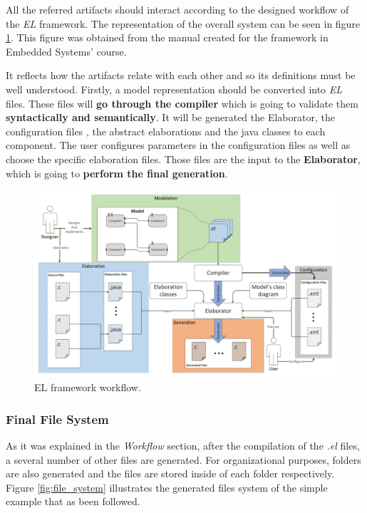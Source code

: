 All the referred artifacts should interact according to the designed workflow of the \textit{EL} framework. The representation of the overall system can be seen in figure \ref{fig:workflow}. This figure was obtained from the manual created for the framework in Embedded Systems' course. 

It reflects how the artifacts relate with each other and so its definitions must be well understood. Firstly, a model representation should be converted into \textit{EL} files. These files will \textbf{go through the compiler} which is going to validate them \textbf{syntactically and semantically}. It will be generated the Elaborator, the configuration files , the abstract elaborations and the java classes to each component. The user configures parameters in the configuration files as well as choose the specific elaboration files. Those files are the input to the \textbf{Elaborator}, which is going to \textbf{perform the final generation}.

\begin{figure}[H]
\centerline{
\includegraphics[scale=0.3]{images/EL_workflow} }
\caption{EL framework workflow.}
\label{fig:workflow} 
\end{figure}



\subsubsection{Final File System}

As it was explained in the \textit{Workflow} section, after the compilation of the \textit{.el} files, a several number of other files are generated. For organizational purposes,  folders are also generated and the files are stored inside of each folder respectively. Figure \ref{fig:file_system} illustrates the generated files system of the simple example that as been followed.   


